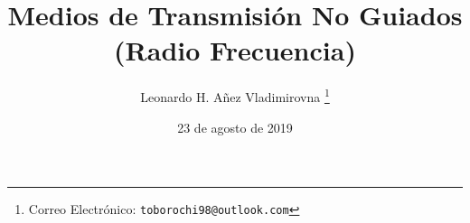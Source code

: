 

\title{Medios de Transmisión No Guiados \\ (Radio Frecuencia)}

\author{Leonardo H. Añez Vladimirovna%
  \thanks{Correo Electrónico: \texttt{toborochi98@outlook.com}}}
\date{23 de agosto de 2019}

\maketitle




